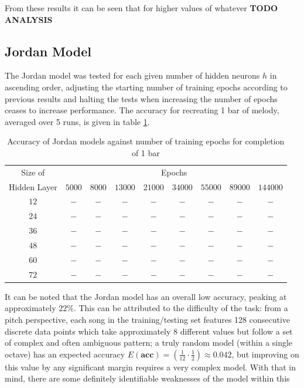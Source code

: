 \documentclass[ author={Stephen Livermore-Tozer},
				supervisor={Dr. Peter Flach},
				degree={MEng},
				title={Algorithmic Co-composition Using Machine Learning},
				subtitle={},
				type={research},
				year={2016} ]{dissertation}
\begin{document}
	From these results it can be seen that for higher values of whatever \textbf{TODO ANALYSIS}
	
	\subsection{Jordan Model}
	\label{sec:objective-jordan}
	
	The Jordan model was tested for each given number of hidden neurons $h$ in ascending order, adjusting the starting number of training epochs according to previous results and halting the tests when increasing the number of epochs ceases to increase performance. The accuracy for recreating 1 bar of melody, averaged over 5 runs, is given in table \ref{tab:jordan-1-bar-results}.
	
	\begin{table}[htp]
		\begin{center}
			\begin{tabular}{ccccccccc}
				\toprule
				Size of& \multicolumn{8}{c}{Epochs}\\
				\cline{2-9}
				Hidden Layer& $5000$ & $8000$ & $13000$ & $21000$ & $34000$ & $55000$ & $89000$ & $144000$\\
				\hline
				$12$ & $-$ & $-$ & $-$ & $-$ & $-$ & $-$ & $-$ & $-$\\
				$24$ & $-$ & $-$ & $-$ & $-$ & $-$ & $-$ & $-$ & $-$\\
				$36$ & $-$ & $-$ & $-$ & $-$ & $-$ & $-$ & $-$ & $-$\\
				$48$ & $-$ & $-$ & $-$ & $-$ & $-$ & $-$ & $-$ & $-$\\
				$60$ & $-$ & $-$ & $-$ & $-$ & $-$ & $-$ & $-$ & $-$\\
				$72$ & $-$ & $-$ & $-$ & $-$ & $-$ & $-$ & $-$ & $-$\\
				\bottomrule
			\end{tabular}
		\end{center}
		\caption{Accuracy of Jordan models against number of training epochs for completion of 1 bar}
		\label{tab:jordan-1-bar-results}
	\end{table}
	
	It can be noted that the Jordan model has an overall low accuracy, peaking at approximately $22\%$. This can be attributed to the difficulty of the task: from a pitch perspective, each song in the training/testing set features 128 consecutive discrete data points which take approximately 8 different values but follow a set of complex and often ambiguous pattern; a truly random model (within a single octave) has an expected accuracy $E(\mathbf{acc}) = (\frac{1}{12} \cdot \frac{1}{2}) \approx 0.042$, but improving on this value by any significant margin requires a very complex model. With that in mind, there are some definitely identifiable weaknesses of the model within this 
	
\end{document}
